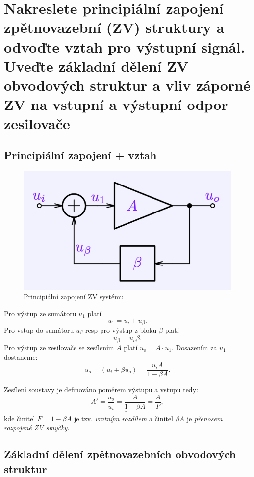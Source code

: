 \documentclass[a4paper,12pt]{article}   %
\begin{document}
\section{Nakreslete principiální zapojení zpětnovazební (ZV) struktury a odvoďte vztah pro výstupní signál. Uveďte základní dělení ZV obvodových struktur a vliv záporné ZV na vstupní a výstupní odpor zesilovače}
\subsection{Principiální zapojení + vztah}


\begin{figure}[h!]
    \centering
    \includegraphics[width=.5\textwidth]{ZV_princip.png}
    \caption{Principiální zapojení ZV systému}
    \label{fig:zv:princip}
\end{figure}

Pro výstup ze sumátoru $u_\text{1}$ platí
\begin{equation*}
    u_\text{1} = u_i + u_\beta.
\end{equation*}
Pro vstup do sumátoru $u_\beta$ resp pro výstup z bloku $\beta$ platí
\begin{equation*}
    u_\beta = u_o \beta.
\end{equation*}
Pro výstup ze zesilovače se zesílením $A$ platí $u_o = A\cdot u_\text{1}$. Dosazením za $u_\text{1}$ dostaneme:
\begin{equation*}
    u_o = (u_i + \beta u_o) = \frac{u_i A}{1-\beta A}.
\end{equation*}

Zesílení soustavy je definováno poměrem výstupu a vstupu tedy:
\begin{equation}
    \underline{\underline{A' = \frac{u_o}{u_i} = \frac{A}{1-\beta A} = \frac{A}{F}}},
\end{equation}
kde činitel $F = 1-\beta A$ je tzv. \textit{vratným rozdílem} a činitel $\beta A$ je \textit{přenosem rozpojené ZV smyčky}. 

\subsection{Základní dělení zpětnovazebních obvodových struktur}
\end{document}
